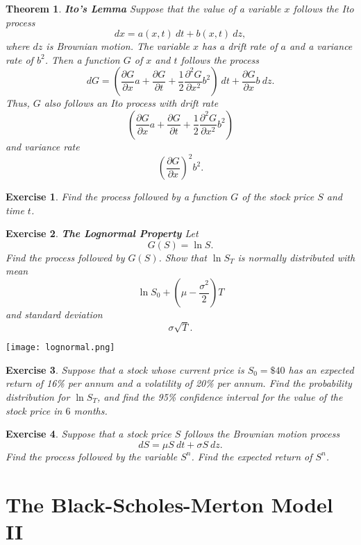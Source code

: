 \documentclass[letterpaper,10pt]{article}
\newtheorem{thm}{Theorem}
\newtheorem{ex}{Exercise}
\begin{document}
\begin{thm}{\bf Ito's Lemma}
Suppose that the value of a variable $x$ follows the Ito process $$dx=a(x,t)\:dt+b(x,t)\:dz,$$ where $dz$ is Brownian motion.  The variable $x$ has a drift rate of $a$ and a variance rate of $b^2$.  Then a function $G$ of $x$ and $t$ follows the process $$dG=\left(\frac{\partial G}{\partial x}a+\frac{\partial G}{\partial t}+\frac{1}{2}\frac{\partial^2G}{\partial x^2}b^2\right)\:dt+\frac{\partial G}{\partial x}b\:dz.$$  Thus, $G$ also follows an Ito process with drift rate $$\left(\frac{\partial G}{\partial x}a+\frac{\partial G}{\partial t}+\frac{1}{2}\frac{\partial^2G}{\partial x^2}b^2\right)$$ and variance rate $$\left(\frac{\partial G}{\partial x}\right)^2b^2.$$
\end{thm}


\begin{ex}
Find the process followed by a function $G$ of the stock price $S$ and time $t$.
\end{ex}


\begin{ex}\label{lognormal}{\bf The Lognormal Property}
Let $$G(S)=\ln S.$$  Find the process followed by $G(S)$.  Show that $\ln S_T$ is normally distributed with mean $$\ln S_0+\left(\mu-\frac{\sigma^2}{2}\right)T$$ and standard deviation $$\sigma\sqrt{T}.$$
\end{ex}

\begin{center}
\texttt{[image: lognormal.png]}
\end{center}


\begin{ex}
 Suppose that a stock whose current price is $S_0=\$40$ has an expected return of 16\% per annum and a volatility of 20\% per annum.  Find the probability distribution for $\ln S_T$, and find the 95\% confidence interval for the value of the stock price in $6$ months.
  \end{ex}



\begin{ex}
Suppose that a stock price $S$ follows the Brownian motion process $$dS=\mu S\:dt+\sigma S\:dz.$$  Find the process followed by the variable $S^n$.  Find the expected return of $S^n$.
\end{ex}




\newpage

\section{The Black-Scholes-Merton Model II}
\end{document}
